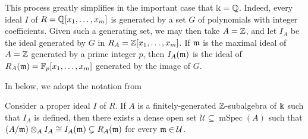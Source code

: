\documentclass[11pt]{amsart}
\newcommand{\mspec}{\operatorname{mSpec}}
\begin{document}
This process greatly simplifies in the important case that $\Bbbk=\mathbb{Q}$.
Indeed, every ideal $I$ of $R=\mathbb{Q}[x_1, \ldots, x_m]$ is generated by a set $G$ of polynomials with integer coefficients.
Given such a generating set, we may then take $A=\mathbb{Z}$, and let $I_A$ be the ideal generated by $G$ in $R_A=\mathbb{Z}[x_1, \ldots, x_m]$.
If  $\mathfrak{m}$ is the maximal ideal of $A=\mathbb{Z}$ generated by a prime integer $p$, then $I_A(\mathfrak{m})$ is the ideal of $R_A(\mathfrak{m}) = \mathbb{F}_p[x_1, \ldots, x_m]$  generated by the image of $G$.


In  below, we adopt the notation from 


\begin{lemma}
\label{noncontainment mod p: L}
Consider a proper ideal $I$ of $R$.  If $A$ is a finitely-generated $\mathbb{Z}$-subalgebra of $\Bbbk$ such that $I_A$ is defined, then there exists a dense open set $\mathcal{U} \subseteq \mspec(A)$ such that $(A/\mathfrak{m}) \otimes_A I_A \cong I_A(\mathfrak{m}) \subsetneq R_A(\mathfrak{m})$ for every $\mathfrak{m} \in \mathcal{U}$.
\end{lemma}
\end{document}
